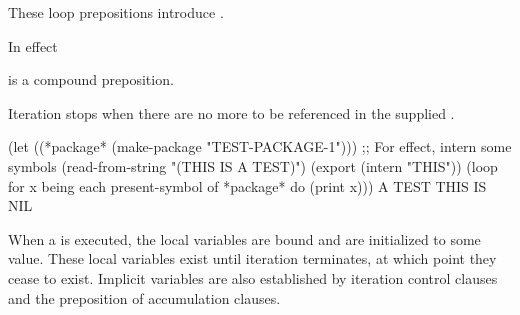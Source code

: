  
These loop prepositions introduce .
 
\endlist

In effect 
                                      


is a compound preposition.

Iteration stops when there are no more  to be referenced 
in the supplied .
 

\code
 (let ((*package* (make-package "TEST-PACKAGE-1")))
   ;; For effect, intern some symbols
   (read-from-string "(THIS IS A TEST)")
   (export (intern "THIS"))
   (loop for x being each present-symbol of *package*
          do (print x)))
\OUT A 
\OUT TEST 
\OUT THIS
\OUT IS 
\EV NIL
\endcode
{}

\endsubsubsubsubsection%

\endsubsubsubsection%

\endsubsubsection%

 
When a   is executed, the local variables are bound and are
initialized to some value.  These local variables exist until 
iteration terminates, at which point they cease to exist.  
Implicit variables are also established by iteration control clauses and the
 preposition of accumulation clauses.

